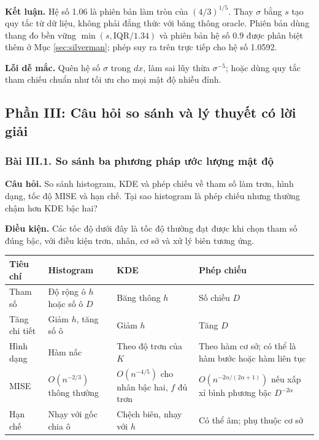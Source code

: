 \textbf{Kết luận.} Hệ số 1.06 là phiên bản làm tròn của $(4/3)^{1/5}$.
Thay $\sigma$ bằng $s$ tạo quy tắc từ dữ liệu, không phải đẳng thức với băng thông oracle.
Phiên bản dùng thang đo bền vững $\min(s,\mathrm{IQR}/1.34)$ và phiên bản hệ số $0.9$
được phân biệt thêm ở Mục \ref{sec:silverman}; phép suy ra trên trực tiếp cho hệ số 1.0592.

\textbf{Lỗi dễ mắc.} Quên hệ số $\sigma$ trong $dx$, làm sai lũy thừa $\sigma^{-5}$;
hoặc dùng quy tắc tham chiếu chuẩn như tối ưu cho mọi mật độ nhiều đỉnh.

\subsection{Phần III: Câu hỏi so sánh và lý thuyết có lời giải}

\subsubsection*{Bài III.1. So sánh ba phương pháp ước lượng mật độ}\label{ot45:comparison}
\textbf{Câu hỏi.} So sánh histogram, KDE và phép chiếu về tham số làm trơn,
hình dạng, tốc độ MISE và hạn chế. Tại sao histogram là phép chiếu nhưng thường chậm hơn KDE bậc hai?

\textbf{Điều kiện.} Các tốc độ dưới đây là tốc độ thường đạt được khi chọn tham số đúng bậc,
với điều kiện trơn, nhân, cơ sở và xử lý biên tương ứng.

\begin{center}
\small
\begin{tabular}{p{}p{}p{}p{}}
\toprule Tiêu chí & Histogram & KDE & Phép chiếu\\\midrule
Tham số & Độ rộng ô $h$ hoặc số ô $D$ & Băng thông $h$ & Số chiều $D$\\
Tăng chi tiết & Giảm $h$, tăng số ô & Giảm $h$ & Tăng $D$\\
Hình dạng & Hàm nấc & Theo độ trơn của $K$ & Theo hàm cơ sở; có thể là hàm bước hoặc hàm liên tục\\
MISE & $O(n^{-2/3})$ thông thường & $O(n^{-4/5})$ cho nhân bậc hai, $f$ đủ trơn & $O(n^{-2\alpha/(2\alpha+1)})$ nếu xấp xỉ bình phương bậc $D^{-2\alpha}$\\
Hạn chế & Nhạy với gốc chia ô & Chệch biên, nhạy với $h$ & Có thể âm; phụ thuộc cơ sở\\
\bottomrule
\end{tabular}
\end{center}

